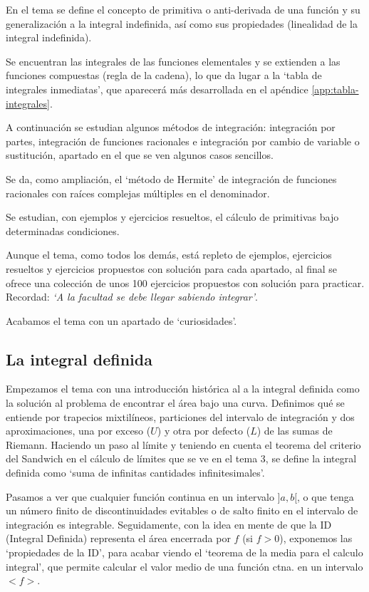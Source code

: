 En el tema se define el concepto de primitiva o anti-derivada de una función y su generalización a la integral indefinida, así como sus propiedades (linealidad de la integral indefinida).

Se encuentran las integrales de las funciones elementales y se extienden a las funciones compuestas (regla de la cadena), lo que da lugar a la `tabla de integrales inmediatas', que aparecerá más desarrollada en el apéndice \ref{app:tabla-integrales}.

A continuación se estudian algunos métodos de integración: integración por partes, integración de funciones racionales e integración por cambio de variable o sustitución, apartado en el que se ven algunos casos sencillos.

Se da, como ampliación, el `método de Hermite' de integración de funciones racionales con raíces complejas múltiples en el denominador.  

Se estudian, con ejemplos y ejercicios resueltos,  el cálculo de primitivas bajo determinadas condiciones.

Aunque el tema, como todos los demás, está repleto de ejemplos, ejercicios resueltos y ejercicios propuestos con solución para cada apartado, al final se ofrece una colección de unos 100 ejercicios propuestos con solución para practicar. Recordad: \emph{`A la facultad se debe llegar sabiendo integrar'}.

Acabamos el tema con un apartado de `curiosidades'.

\subsection{La integral definida}

Empezamos el tema con una introducción histórica al a la integral definida como la solución al problema de encontrar el área bajo una curva. Definimos qué se entiende por trapecios mixtilíneos, particiones del intervalo de integración y dos aproximaciones, una por exceso ($U$) y otra por defecto ($L$) de las sumas de Riemann. Haciendo un paso al límite y teniendo en cuenta el teorema del  criterio del Sandwich en el cálculo de límites que se ve en el tema 3, se define la integral definida como `suma de infinitas cantidades infinitesimales'.

Pasamos a ver que cualquier función continua en un intervalo $]a,b[$, o que tenga un número finito de discontinuidades evitables o de salto finito en el intervalo de integración es integrable. Seguidamente, con la idea en mente de que la ID (Integral Definida) representa el área encerrada por $f$ (si $f>0$), exponemos las `propiedades de la ID', para acabar viendo el `teorema de la media para el calculo integral', que permite calcular el valor medio de una función ctna. en un intervalo $<f>$.

